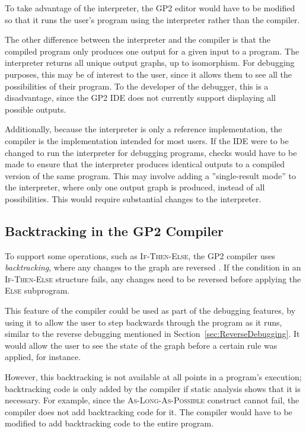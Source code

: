 \documentclass[authoryearcitations]{UoYCSproject}
\begin{document}
To take advantage of the interpreter, the GP2 editor would have to be modified
so that it runs the user's program using the interpreter rather than the compiler.

The other difference between the interpreter and the compiler is that the compiled
program only produces one output for a given input to a program. The interpreter
returns all unique output graphs, up to isomorphism. For debugging purposes, this
may be of interest to the user, since it allows them to see all the possibilities
of their program. To the developer of the debugger, this is a disadvantage, since
the GP2 IDE does not currently support displaying all possible outputs.

Additionally, because the interpreter is only a reference implementation, the
compiler is the implementation intended for most users. If the IDE were to be
changed to run the interpreter for debugging programs, checks would have to be
made to ensure that the interpreter produces identical outputs to a compiled
version of the same program. This may involve adding a ''single-result mode'' to
the interpreter, where only one output graph is produced, instead of all
possibilities. This would require substantial changes to the interpreter.


\subsection{Backtracking in the GP2 Compiler}
\label{sec:BacktrackingInTheGP2Compiler}

To support some operations, such as \textsc{If-Then-Else}, the GP2 compiler uses
\emph{backtracking}, where any changes to the graph are reversed \citep[ch. 5.8]{bak2015}.
If the condition in an \textsc{If-Then-Else} structure fails, any changes need
to be reversed before applying the \textsc{Else} subprogram.

This feature of the compiler could be used as part of the debugging features,
by using it to allow the user to step backwards through the program as it runs,
similar to the reverse debugging mentioned in Section~\ref{sec:ReverseDebugging}.
It would allow the user to see the state of the graph before a certain rule was
applied, for instance.

However, this backtracking is not available at all points in a program's
execution; backtracking code is only added by the compiler if static analysis
shows that it is necessary. For example, since the \textsc{As-Long-As-Possible}
construct cannot fail, the compiler does not add backtracking code for it. The
compiler would have to be modified to add backtracking code to the entire
program.
\end{document}
